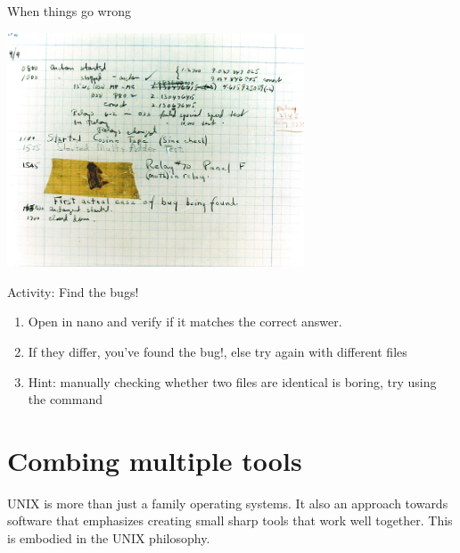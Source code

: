 \begin{frame}{When things go wrong}
\begin{center}
\includegraphics[width=250pt]{bug}
\end{center}
\end{frame}

\begin{frame}{Activity: Find the bugs!}

\begin{enumerate}
\item Open  in nano and verify if it matches the correct answer.
\item If they differ, you've found the bug!, else try again with different
 files
\item Hint: manually checking whether two files are identical is boring, try
using the  command
\end{enumerate}
\end{frame}


\section{Combing multiple tools} %
UNIX is more than just a family operating systems. It also an approach towards
software that emphasizes creating small sharp tools that work well together.
This is embodied in the UNIX philosophy.   

